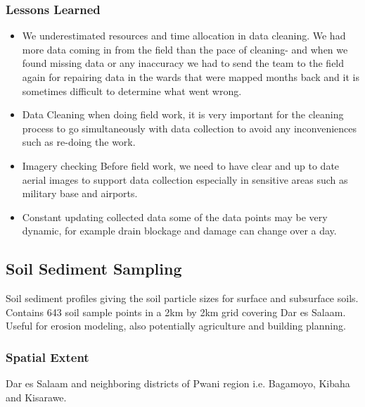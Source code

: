 \documentclass[a4paper,12pt,twoside]{article}
\begin{document}
\subsubsection{Lessons Learned}
\begin{itemize}
    

\item {\color {RHblue}{Field work outpacing data cleaning and analysis}}
We underestimated resources and time allocation in data cleaning. We had more data coming in from the field than the pace of cleaning- and when we found missing data or any inaccuracy we had to send the team to the field again for repairing data in the wards that were mapped months back and it is sometimes difficult to determine what went wrong. 
\item {\color {RHblue} {Data Cleaning}}
when doing field work, it is very important for the cleaning process to go simultaneously with data collection to avoid any inconveniences such as re-doing the work.
\item{\color {RHblue} {Imagery checking}}
Before field work, we need to have clear and up to date aerial images to support data collection especially in sensitive areas such as military base and airports.
\item {\color {RHblue} {Constant updating collected data}} some of the data points may be very dynamic, for example drain blockage and damage can change over a day.
\end{itemize}
\newpage
\subsection{Soil Sediment Sampling}

Soil sediment profiles giving the soil particle sizes for surface and subsurface soils. Contains 643 soil sample points in a 2km by 2km grid covering Dar es Salaam.
Useful for erosion modeling, also potentially agriculture and building planning. 

\subsubsection{Spatial Extent}
Dar es Salaam and neighboring districts of Pwani region i.e. Bagamoyo, Kibaha and Kisarawe.
\end{document}
